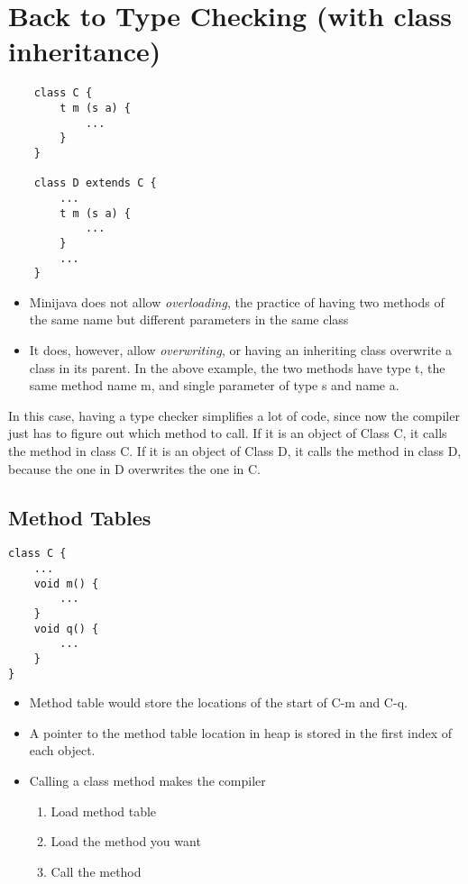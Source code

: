 \documentclass[10pt]{article}
\begin{document}
\section*{Back to Type Checking (with class inheritance)}
\begin{verbatim}
    class C {
        t m (s a) {
            ...
        }
    }

    class D extends C {
        ... 
        t m (s a) {
            ...
        }
        ...
    }
\end{verbatim}
\begin{itemize}
    \item Minijava does not allow \textit{overloading}, the practice of having two methods of the same name but different parameters in the same class
    \item It does, however, allow \textit{overwriting}, or having an inheriting class overwrite a class in its parent.  In the above example, the two methods have type t, the same method name m, and single parameter of type s and name a.
\end{itemize}
In this case, having a type checker simplifies a lot of code, since now the compiler just has to figure out which method to call.  If it is an object of Class C, it calls the method in class C.  If it is an object of Class D, it calls the method in class D, because the one in D overwrites the one in C.

\subsection*{Method Tables}
\begin{verbatim}
class C {
    ...
    void m() {
        ...
    }
    void q() {
        ...
    }
}
\end{verbatim}

\begin{itemize}
    \item Method table would store the locations of the start of C-m and C-q.
    \item A pointer to the method table location in heap is stored in the first index of each object.
    \item Calling a class method makes the compiler
    \begin{enumerate}
        \item Load method table
        \item Load the method you want
        \item Call the method
    \end{enumerate}
\end{itemize}
\end{document}
